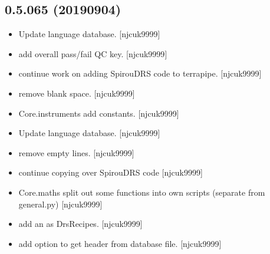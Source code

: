 \documentclass[a4paper,10pt,english]{report}
\begin{document}
\subsection{0.5.065 (2019\sphinxhyphen{}09\sphinxhyphen{}04)}
\label{\detokenize{misc/changelog:id97}}\begin{itemize}
\item {} 
Update language database. {[}njcuk9999{]}

\item {} 
 \sphinxhyphen{} add overall pass/fail QC key. {[}njcuk9999{]}

\item {} 
 \sphinxhyphen{} continue work on adding SpirouDRS code to terrapipe.
{[}njcuk9999{]}

\item {} 
 \sphinxhyphen{} remove blank space. {[}njcuk9999{]}

\item {} 
Core.instruments \sphinxhyphen{} add  constants. {[}njcuk9999{]}

\item {} 
Update language database. {[}njcuk9999{]}

\item {} 
 \sphinxhyphen{} remove empty lines. {[}njcuk9999{]}

\item {} 
 \sphinxhyphen{} continue copying over SpirouDRS code
 {[}njcuk9999{]}

\item {} 
Core.maths \sphinxhyphen{} split out some functions into own scripts (separate from
general.py) {[}njcuk9999{]}

\item {} 
 \sphinxhyphen{} add  an  as
DrsRecipes. {[}njcuk9999{]}

\item {} 
 \sphinxhyphen{} add option to get header from database
file. {[}njcuk9999{]}

\end{itemize}
\end{document}
